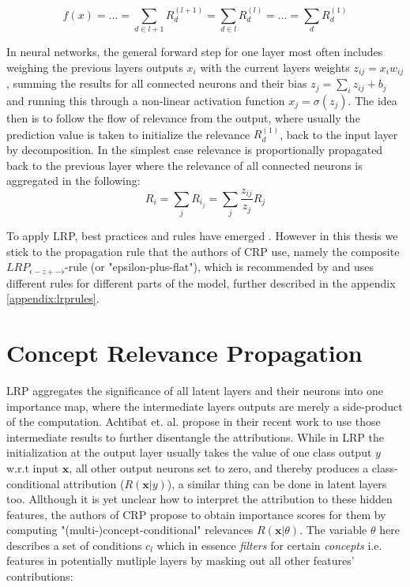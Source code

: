 \begin{equation}
    f(x) = ... = \sum_{d \in l+1} R^{(l+1)}_d =  \sum_{d \in l} R^{(l)}_d = ... =  \sum_{d} R^{(1)}_d
\end{equation}

In neural networks, the general forward step for one layer most often includes weighing the previous layers outputs $x_i$ with the current layers weights $z_{ij} = x_i w_{ij}$, summing the results for all connected neurons and their bias $z_{j} = \sum_{i} z_{ij} + b_j$ and running this through a non-linear activation function $x_j = \sigma (z_j)$.
The idea then is to follow the flow of relevance from the output, where usually the prediction value is taken to initialize the relevance $R^(1)_d$, back to the input layer by decomposition. In the simplest case relevance is proportionally propagated back to the previous layer where the relevance of all connected neurons is aggregated in the following:
\begin{equation}
    R_i = \sum_{j}  R_{i_j} = \sum_{j} \frac{z_{ij}}{z_j} R_j
\end{equation}

To apply LRP, best practices and rules have emerged \cite{Kohlbrenner2020, Montavon2019, Samek2021}. However in this thesis we stick to the propagation rule that the authors of CRP use, namely the composite $LRP_{\epsilon-z+-\flat}$-rule (or "epsilon-plus-flat"), which is recommended by \cite{Kohlbrenner2020} and uses different rules for different parts of the model, further described in the appendix \autoref{appendix:lrprules}.

\section{Concept Relevance Propagation}
LRP aggregates the significance of all latent layers and their neurons into one importance map, where the intermediate layers outputs are merely a side-product of the computation.
Achtibat et. al. propose in their recent work \cite{Achtibat2022} to use those intermediate results to further disentangle the attributions. While in LRP the initialization at the output layer usually takes the value of one class output $y$ w.r.t input $\mathbf{x}$, all other output neurons set to zero, and thereby produces a class-conditional attribution ($R(\mathbf{x}|y)$), a similar thing can be done in latent layers too. Allthough it is yet unclear how to interpret the attribution to these hidden features, the authors of CRP propose to obtain importance scores for them by computing "(multi-)concept-conditional" relevances $R(\mathbf{x}|\theta)$. The variable $\theta$ here describes a set of conditions $c_l$ which in essence \textit{filters} for certain \textit{concepts} i.e. features in potentially mutliple layers by masking out all other features' contributions:

